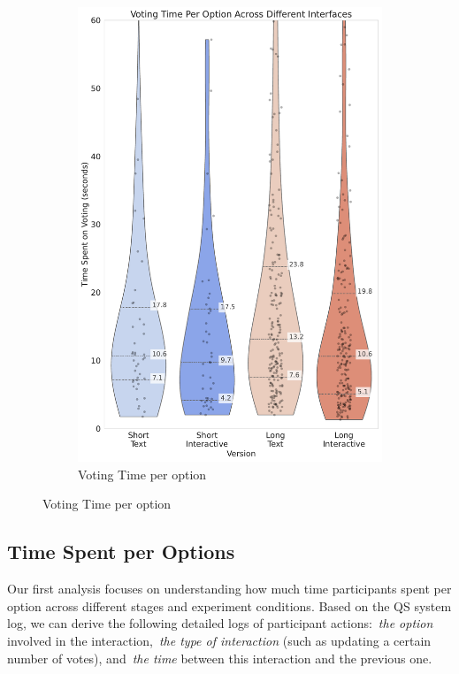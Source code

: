 \begin{figure}[htbp]
{\begin{minipage}{0.78\pdfpageheight}
\begin{subfigure}[b]{0.26\pdfpageheight}
                \includegraphics[width=\textwidth]{content/image/results/voting_time_per_option.pdf}
                \caption{Voting Time per option}
                \label{fig:vote_time}
            \end{subfigure}
        \end{minipage}
    }
    \label{fig:time_per_option_full}
\end{figure}


\subsection{Time Spent per Options}
\label{sec:time_per_option}
Our first analysis focuses on understanding how much time participants spent per option across different stages and experiment conditions. Based on the QS system log, we can derive the following detailed logs of participant actions:~\textit{the option}  involved in the interaction,~\textit{the type of interaction} (such as updating a certain number of votes), and~\textit{the time} between this interaction and the previous one.

